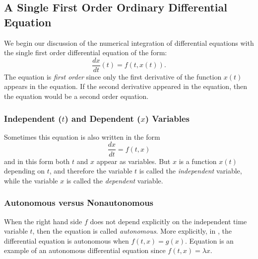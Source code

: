 \subsection*{A Single First Order Ordinary Differential Equation}

We begin our discussion of the numerical integration of
differential equations with the single first order  differential equation
of the form:
\begin{equation} \label{nonaut}
\frac{dx}{dt}(t) = f(t,x(t)).
\end{equation}
The equation is {\em first order\/} since only the first
derivative of the function $x(t)$ appears in the equation. If
the second derivative appeared in the equation, then the equation
would be a second order equation.

\subsubsection*{Independent ($t$) and Dependent ($x$) Variables}

Sometimes this equation is also written in the form
\begin{equation}  \label{nonaut2}
	\frac{dx}{dt} = f(t,x)
\end{equation}
and in this form both $t$ and $x$ appear as variables.  But $x$
is a function $x(t)$ depending on $t$, and therefore the
variable $t$ is called the {\em independent\/}
 variable, while the variable $x$ is
called the {\em dependent\/}  variable.

\subsubsection*{Autonomous versus Nonautonomous}

When the right hand side $f$ does not depend explicitly on the
independent time variable $t$, then the equation is called {\em
autonomous\/}.
More explicitly, in
, the differential equation is autonomous when
$f(t,x)=g(x)$.  Equation  is an example of an
autonomous differential equation since $f(t,x)=\lambda x$.

